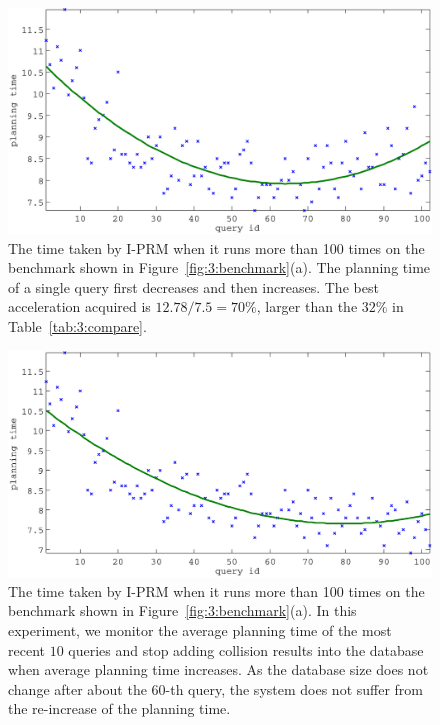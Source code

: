 \begin{figure}[htb]
  \centering
  \includegraphics[width=0.8\linewidth]{figs/3/curve1-crop.pdf}
  \caption[Time taken by I-PRM when it runs more than 100 times on the benchmark shown Figure~\ref{fig:3:benchmark}(a). The planning time first decreases and then increases because I-PRM continues updating the dataset in well-learned regions]{\label{fig:3:curve} The time taken by I-PRM when it runs more than 100 times on the benchmark shown in Figure~\ref{fig:3:benchmark}(a). The planning time of a single query first decreases and then increases. The best acceleration acquired is $12.78/7.5 = 70\%$, larger than the $32\%$ in Table~\ref{tab:3:compare}.}
\end{figure}
\begin{figure}[htb]
  \centering
  \includegraphics[width=0.8\linewidth]{figs/3/curve2-crop.pdf}
  \caption[Time taken by I-PRM when it runs more than 100 times on the benchmark shown Figure~\ref{fig:3:benchmark}(a). The planning time always decreases because I-PRM stops updating the dataset in well-learned regions]{\label{fig:3:curve2} The time taken by I-PRM when it runs more than 100 times on the benchmark shown in Figure~\ref{fig:3:benchmark}(a). In this experiment, we monitor the average planning time of the most recent $10$ queries and stop adding collision results into the database when average planning time increases. As the database size does not change after about the $60$-th query, the system does not suffer from the re-increase of the planning time. }
\end{figure}



